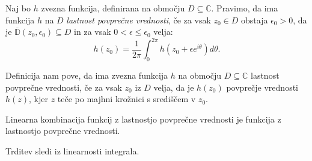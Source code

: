 \documentclass[mat1]{fmfdelo}
\newcommand{\C}{\mathbb C}
\begin{document}
    \begin{definicija}
        Naj bo $h$ zvezna funkcija, definirana na območju $D \subseteq \C$. Pravimo, da ima funkcija $h$ na $D$ \emph{lastnost povprečne vrednosti}, če za vsak $z_0 \in D$ obstaja $\epsilon_0 > 0$, da je $\overline{\mathbb{D}}(z_0, \epsilon_0) \subseteq D$ in za vsak $0 < \epsilon \leq \epsilon_0 $ velja:
        $$
            h(z_0) = \frac{1}{2 \pi} \int_{0}^{2 \pi}{h(z_0 + \epsilon e^{i \theta}) d\theta}.
        $$
    \end{definicija}
    \begin{opomba}
        Definicija nam pove, da ima zvezna funkcija $h$ na območju $D \subseteq \C$ lastnost povprečne vrednosti, če za vsak $z_0$ iz $D$ velja, 
        da je $h(z_0)$ povprečje vrednosti $h(z)$, kjer $z$ teče po majhni krožnici s središčem v $z_0$.
    \end{opomba}
    \begin{trditev}
        \label{linlpv}
        Linearna kombinacija funkcij z lastnostjo povprečne vrednosti je funkcija z lastnostjo povprečne vrednosti. 
    \end{trditev}
    \begin{dokaz}
        Trditev sledi iz linearnosti integrala.
    \end{dokaz}

\end{document}
